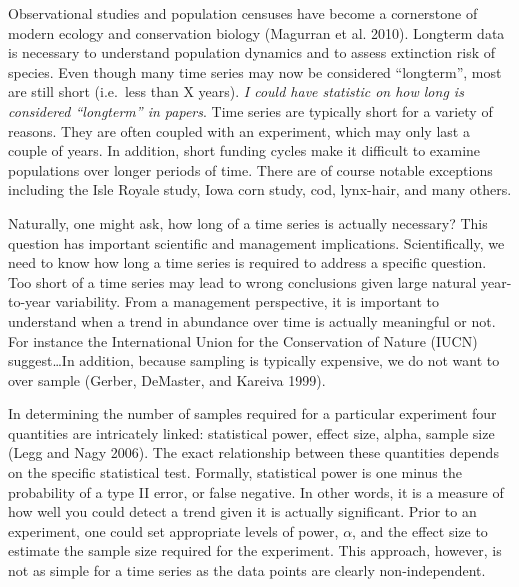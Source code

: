\documentclass[11pt,]{article}
\begin{document}
Observational studies and population censuses have become a cornerstone
of modern ecology and conservation biology (Magurran et al. 2010).
Longterm data is necessary to understand population dynamics and to
assess extinction risk of species. Even though many time series may now
be considered ``longterm'', most are still short (i.e.~less than X
years). \emph{I could have statistic on how long is considered
``longterm'' in papers}. Time series are typically short for a variety
of reasons. They are often coupled with an experiment, which may only
last a couple of years. In addition, short funding cycles make it
difficult to examine populations over longer periods of time. There are
of course notable exceptions including the Isle Royale study, Iowa corn
study, cod, lynx-hair, and many others.

Naturally, one might ask, how long of a time series is actually
necessary? This question has important scientific and management
implications. Scientifically, we need to know how long a time series is
required to address a specific question. Too short of a time series may
lead to wrong conclusions given large natural year-to-year variability.
From a management perspective, it is important to understand when a
trend in abundance over time is actually meaningful or not. For instance
the International Union for the Conservation of Nature (IUCN)
suggest\ldots{}In addition, because sampling is typically expensive, we
do not want to over sample (Gerber, DeMaster, and Kareiva 1999).

In determining the number of samples required for a particular
experiment four quantities are intricately linked: statistical power,
effect size, alpha, sample size (Legg and Nagy 2006). The exact
relationship between these quantities depends on the specific
statistical test. Formally, statistical power is one minus the
probability of a type II error, or false negative. In other words, it is
a measure of how well you could detect a trend given it is actually
significant. Prior to an experiment, one could set appropriate levels of
power, \(\alpha\), and the effect size to estimate the sample size
required for the experiment. This approach, however, is not as simple
for a time series as the data points are clearly non-independent.
\end{document}
